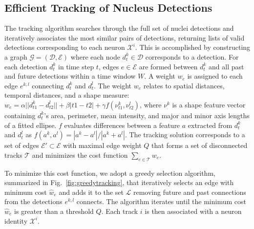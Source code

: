\vspace{-3mm}
\subsection{Efficient Tracking of Nucleus Detections}
\label{sec:tracking}
\vspace{-2mm}

The tracking  algorithm searches through the  full set of  nuclei detections and
iteratively associates the most similar  pairs of detections, returning lists of
valid  detections  corresponding  to   each  neuron  $\mathcal{X}^i$.   This  is
accomplished  by  constructing  a graph  $\mathcal{G}=(\mathcal{D},\mathcal{E})$
where each  node $d^k_t \in \mathcal{D}$  corresponds to a  detection.  For each
detection $d^k_t$ in time step $t$, edges $e \in \mathcal{E}$ are formed between
$d^k_t$ and all  past and future detections within a time  window $W$.  A weight
$w_e$ is assigned to each edge $e^{k,l}$ connecting $d^k_t$ and $d^l_t$. The weight $w_e$  relates to spatial distances, temporal distances, and
a shape measure:  $w_{e} = \alpha || d^k_{t1}  - d^l_{t2} || + \beta |t1  - t2| +
\gamma f(\nu^k_{t1}, \nu^l_{t2})$,  where
$\nu^k$ is a shape feature vector containing $d^k_t$'s area, perimeter, mean
intensity, and major  and minor axis lengths of a  fitted ellipse. $f$ evaluates
differences  between  a  feature  $a$  extracted from  $d^k_t$  and  $d^l_t$  as
$f(a^k,a^l) = {|a^k  - a^l|}/{|a^k + a^l|}$. %
The  tracking solution  corresponds  to  a set  of  edges $\mathcal{E'}  \subset
\mathcal{E}$  with maximal  edge weight  $Q$ that  forms a  set  of disconnected
tracks $\mathcal{T}$  and minimizes the cost function  $\sum_{e \in \mathcal{T}}
w_e$.

To minimize this cost function, we adopt a greedy selection algorithm,
summarized  in Fig.~\ref{fig:greedytracking},  that iteratively  selects  an edge
with minimum  cost $\hat w_e$  and adds it  to the set %
 $\mathcal{L}$ removing
future  and  past  connections  from  the  detections  $e^{k,l}$  connects.  The
algorithm iterates until the minimum cost $\hat w_e$ is greater than a threshold
$Q$. %
 Each track $i$ is then associated with a neuron identity $\mathcal{X}^i$.



